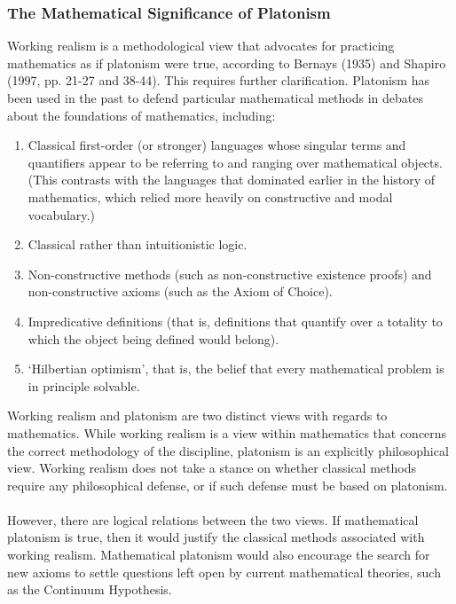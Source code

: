 \documentclass[10pt,a4paper]{article}
\newcounter{theo}
\begin{document}
                    \subsubsection{The Mathematical Significance of Platonism}
                        Working realism is a methodological view that advocates for practicing mathematics as if platonism were true, according to Bernays (1935) and Shapiro (1997, pp. 21-27 and 38-44). This requires further clarification. Platonism has been used in the past to defend particular mathematical methods in debates about the foundations of mathematics, including:
                        \begin{enumerate}
                            \item Classical first-order (or stronger) languages whose singular terms and quantifiers appear to be referring to and ranging over mathematical objects. (This contrasts with the languages that dominated earlier in the history of mathematics, which relied more heavily on constructive and modal vocabulary.)
                            \item Classical rather than intuitionistic logic.
                            \item Non-constructive methods (such as non-constructive existence proofs) and non-constructive axioms (such as the Axiom of Choice).
                            \item Impredicative definitions (that is, definitions that quantify over a totality to which the object being defined would belong).
                            \item ‘Hilbertian optimism’, that is, the belief that every mathematical problem is in principle solvable.
                        \end{enumerate}
                        Working realism and platonism are two distinct views with regards to mathematics. While working realism is a view within mathematics that concerns the correct methodology of the discipline, platonism is an explicitly philosophical view. Working realism does not take a stance on whether classical methods require any philosophical defense, or if such defense must be based on platonism.
                        \\
                        \\
                        However, there are logical relations between the two views. If mathematical platonism is true, then it would justify the classical methods associated with working realism. Mathematical platonism would also encourage the search for new axioms to settle questions left open by current mathematical theories, such as the Continuum Hypothesis.
\end{document}
